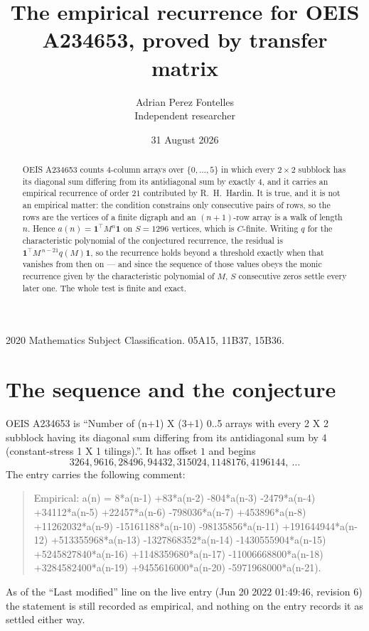 \documentclass[11pt,a4paper]{article}
\title{The empirical recurrence for OEIS A234653, proved by transfer matrix}
\author{Adrian Perez Fontelles\\ \small Independent researcher}
\date{31 August 2026}
\theoremstyle{plain}
\theoremstyle{definition}
\begin{document}
\maketitle

\begin{abstract}
OEIS A234653 counts $4$-column arrays over $\{0,\dots,5\}$ in which every
$2\times2$ subblock has its diagonal sum differing from its antidiagonal sum by
exactly $4$, and it
carries an empirical recurrence of order $21$ contributed by R.~H.~Hardin. It is true,
and it is not an empirical matter: the condition constrains only consecutive pairs of rows,
so the rows are the vertices of a finite digraph and an $(n+1)$-row array is a walk of
length $n$. Hence $a(n)=\mathbf{1}^{\!\top}M^{n}\mathbf{1}$ on $S=1296$ vertices, which
is $C$-finite. Writing $q$ for the characteristic polynomial of the conjectured recurrence,
the residual is $\mathbf{1}^{\!\top}M^{\,n-21}q(M)\mathbf{1}$, so the recurrence
holds beyond a threshold exactly when that vanishes from then on --- and since the sequence
of those values obeys the monic recurrence given by the characteristic polynomial of $M$,
$S$ consecutive zeros settle every later one. The whole test is finite and exact.
\end{abstract}

\noindent\small 2020 Mathematics Subject Classification. 05A15, 11B37, 15B36.\normalsize

\section{The sequence and the conjecture}

OEIS A234653 is ``Number of (n+1) X (3+1) 0..5 arrays with every 2 X 2 subblock having its diagonal sum differing from its antidiagonal sum by 4 (constant-stress 1 X 1 tilings).''. It has offset
$1$ and begins
\[
3264, 9616, 28496, 94432, 315024, 1148176, 4196144,\ \dots
\]
The entry carries the following comment:
\begin{quote}\small
Empirical: a(n) = 8*a(n-1) +83*a(n-2) -804*a(n-3) -2479*a(n-4) +34112*a(n-5) +22457*a(n-6) -798036*a(n-7) +453896*a(n-8) +11262032*a(n-9) -15161188*a(n-10) -98135856*a(n-11) +191644944*a(n-12) +513355968*a(n-13) -1327868352*a(n-14) -1430555904*a(n-15) +5245827840*a(n-16) +1148359680*a(n-17) -11006668800*a(n-18) +3284582400*a(n-19) +9455616000*a(n-20) -5971968000*a(n-21).
\end{quote}
As of the ``Last modified'' line on the live entry (Jun 20 2022 01:49:46, revision 6) the statement is
still recorded as empirical, and nothing on the entry records it as settled either way.
\end{document}

